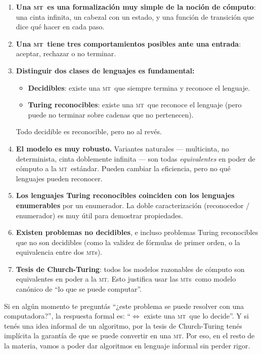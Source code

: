 \documentclass[11pt,a4paper]{article}
\theoremstyle{definicion}
\newcommand{\MT}{\textsc{mt}}
\newcommand{\MTs}{\textsc{mt}s}
\begin{document}
\begin{enumerate}
    \item \textbf{Una \MT\ es una formalización muy simple de la noción de cómputo}: una cinta infinita, un cabezal con un estado, y una función de transición que dice qué hacer en cada paso.

    \item \textbf{Una \MT\ tiene tres comportamientos posibles ante una entrada}: aceptar, rechazar o no terminar.

    \item \textbf{Distinguir dos clases de lenguajes es fundamental:}
    \begin{itemize}
        \item \textbf{Decidibles}: existe una \MT\ que siempre termina y reconoce el lenguaje.
        \item \textbf{Turing reconocibles}: existe una \MT\ que reconoce el lenguaje (pero puede no terminar sobre cadenas que no pertenecen).
    \end{itemize}
    Todo decidible es reconocible, pero no al revés.

    \item \textbf{El modelo es muy robusto.} Variantes naturales --- multicinta, no determinista, cinta doblemente infinita --- son todas \emph{equivalentes} en poder de cómputo a la \MT\ estándar. Pueden cambiar la eficiencia, pero no qué lenguajes pueden reconocer.

    \item \textbf{Los lenguajes Turing reconocibles coinciden con los lenguajes enumerables} por un enumerador. La doble caracterización (reconocedor / enumerador) es muy útil para demostrar propiedades.

    \item \textbf{Existen problemas no decidibles}, e incluso problemas Turing reconocibles que no son decidibles (como la validez de fórmulas de primer orden, o la equivalencia entre dos \MTs).

    \item \textbf{Tesis de Church-Turing}: todos los modelos razonables de cómputo son equivalentes en poder a la \MT. Esto justifica usar las \MTs\ como modelo canónico de ``lo que se puede computar''.
\end{enumerate}

\begin{intuicion}
Si en algún momento te preguntás ``¿este problema se puede resolver con una computadora?'', la respuesta formal es: ``$\Leftrightarrow$ existe una \MT\ que lo decide''. Y si tenés una idea informal de un algoritmo, por la tesis de Church-Turing tenés implícita la garantía de que se puede convertir en una \MT. Por eso, en el resto de la materia, vamos a poder dar algoritmos en lenguaje informal sin perder rigor.
\end{intuicion}
\end{document}
